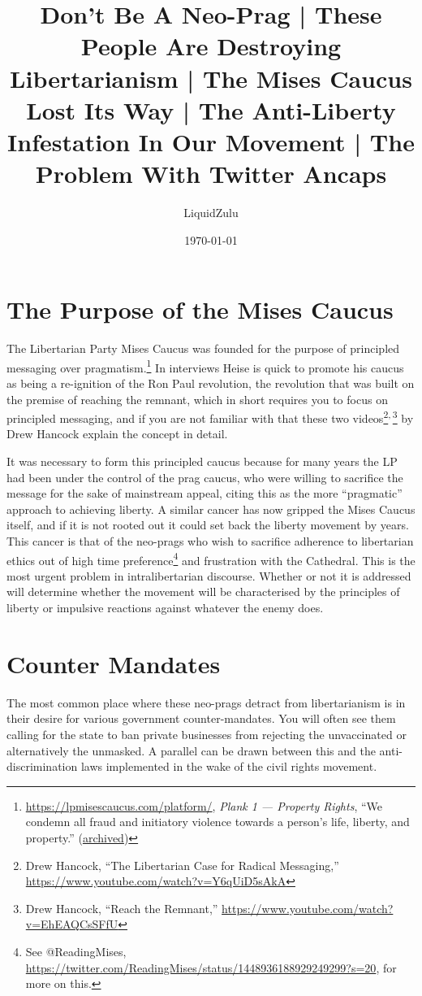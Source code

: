 \documentclass[11pt]{article}
\author{LiquidZulu}
\date{\today}
\title{Don't Be A Neo-Prag | These People Are Destroying Libertarianism | The Mises Caucus Lost Its Way | The Anti-Liberty Infestation In Our Movement | The Problem With Twitter Ancaps}
\begin{document}
\maketitle
\tableofcontents


\section{The Purpose of the Mises Caucus}
\label{sec:org537fe76}
The Libertarian Party Mises Caucus was founded for the purpose of principled messaging over pragmatism.\footnote{\url{https://lpmisescaucus.com/platform/}, \emph{Plank 1 --- Property Rights}, ``We condemn all fraud and initiatory violence towards a person’s life, liberty, and property.'' (\href{https://archive.ph/5upKF}{archived})} In interviews Heise is quick to promote his caucus as being a re-ignition of the Ron Paul revolution, the revolution that was built on the premise of reaching the remnant, which in short requires you to focus on principled messaging, and if you are not familiar with that these two videos\footnote{Drew Hancock, ``The Libertarian Case for Radical Messaging,'' \url{https://www.youtube.com/watch?v=Y6qUiD5sAkA}}\textsuperscript{,}\,\footnote{Drew Hancock, ``Reach the Remnant,'' \url{https://www.youtube.com/watch?v=EhEAQCsSFfU}} by Drew Hancock explain the concept in detail.

It was necessary to form this principled caucus because for many years the LP had been under the control of the prag caucus, who were willing to sacrifice the message for the sake of mainstream appeal, citing this as the more ``pragmatic'' approach to achieving liberty. A similar cancer has now gripped the Mises Caucus itself, and if it is not rooted out it could set back the liberty movement by years. This cancer is that of the neo-prags who wish to sacrifice adherence to libertarian ethics out of high time preference\footnote{See @ReadingMises, \url{https://twitter.com/ReadingMises/status/1448936188929249299?s=20}, for more on this.} and frustration with the Cathedral. This is the most urgent problem in intralibertarian discourse. Whether or not it is addressed will determine whether the movement will be characterised by the principles of liberty or impulsive reactions against whatever the enemy does.

\section{Counter Mandates}
\label{sec:org3fa1372}
The most common place where these neo-prags detract from libertarianism is in their desire for various government counter-mandates. You will often see them calling for the state to ban private businesses from rejecting the unvaccinated or alternatively the unmasked. A parallel can be drawn between this and the anti-discrimination laws implemented in the wake of the civil rights movement.
\end{document}
